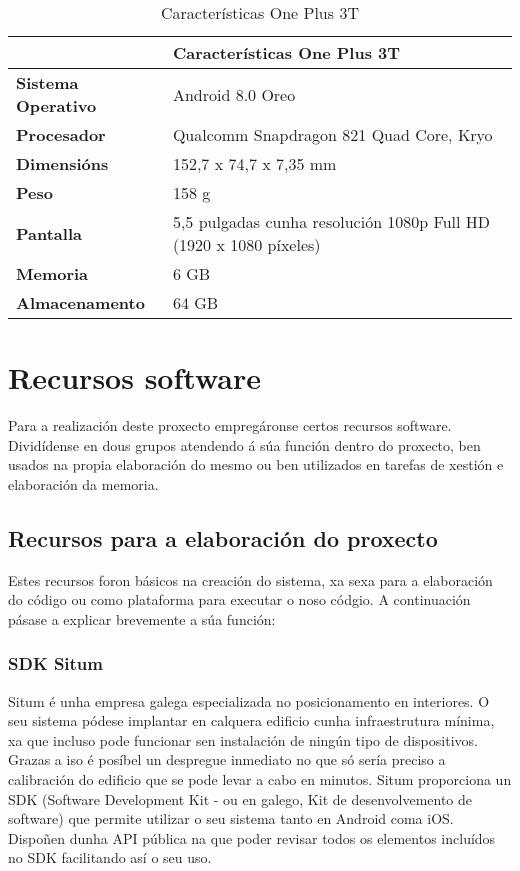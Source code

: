 \begin{table} [tbp]
	\begin{tabular}{|l|p{10cm}|}
		\hline 
		& \textbf{Características One Plus 3T} \\ 
		\hline 
		\textbf{Sistema Operativo} & Android 8.0 Oreo \\ 
		\hline 
		\textbf{Procesador} & Qualcomm Snapdragon 821 Quad Core, Kryo \\ 
		\hline 
		\textbf{Dimensións} & 152,7 x 74,7 x 7,35 mm \\ 
		\hline 
		\textbf{Peso} & 158 g \\ 
		\hline 
		\textbf{Pantalla} & 5,5 pulgadas cunha resolución 1080p Full HD (1920 x 1080 píxeles) \\ 
		\hline 
		\textbf{Memoria} & 6 GB \\ 
		\hline
		\textbf{Almacenamento} & 64 GB \\ 
		\hline 
	\end{tabular}
	\caption{Características One Plus 3T}
	\label{tab:tabCaracteristicasOnePlus}
\end{table}


\section{Recursos software}
Para a realización deste proxecto empregáronse certos recursos software. Dividídense en dous grupos atendendo á súa función dentro do proxecto, ben usados na propia elaboración do mesmo ou ben utilizados en tarefas de xestión e elaboración da memoria.

\subsection{Recursos para a elaboración do proxecto}
Estes recursos foron básicos na creación do sistema, xa sexa para a elaboración do código ou como plataforma para executar o noso códgio. A continuación pásase a explicar brevemente a súa función:

\subsubsection{SDK Situm}
Situm é unha empresa galega especializada no posicionamento en interiores. O seu sistema pódese implantar en calquera edificio cunha infraestrutura mínima, xa que incluso pode funcionar sen instalación de ningún tipo de dispositivos. Grazas a iso é posíbel un despregue inmediato no que só sería preciso a calibración do edificio que se pode levar a cabo en minutos. Situm proporciona un SDK (Software Development Kit - ou en galego, Kit de desenvolvemento de software) que permite utilizar o seu sistema tanto en Android coma iOS. Dispoñen dunha API pública na que poder revisar todos os elementos incluídos no SDK facilitando así o seu uso.



